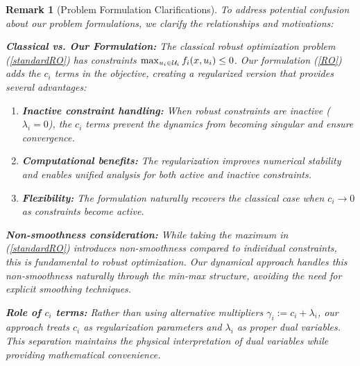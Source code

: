\documentclass[journal,twoside,web]{ieeecolor}
\newtheorem{remark}{Remark}
\begin{document}
{\color{blue} \begin{remark}[Problem Formulation Clarifications]
To address potential confusion about our problem formulations, we clarify the relationships and motivations:

\textbf{Classical vs. Our Formulation:} The classical robust optimization problem (\ref{standardRO}) has constraints $\max_{u_i \in {\cal U}_i} f_i(x,u_i) \leq 0$. Our formulation (\ref{RO}) adds the $c_i$ terms in the objective, creating a regularized version that provides several advantages:

\begin{enumerate}
\item \textbf{Inactive constraint handling:} When robust constraints are inactive ($\lambda_i = 0$), the $c_i$ terms prevent the dynamics from becoming singular and ensure convergence.
\item \textbf{Computational benefits:} The regularization improves numerical stability and enables unified analysis for both active and inactive constraints.
\item \textbf{Flexibility:} The formulation naturally recovers the classical case when $c_i \to 0$ as constraints become active.
\end{enumerate}

\textbf{Non-smoothness consideration:} While taking the maximum in (\ref{standardRO}) introduces non-smoothness compared to individual constraints, this is fundamental to robust optimization. Our dynamical approach handles this non-smoothness naturally through the min-max structure, avoiding the need for explicit smoothing techniques.

\textbf{Role of $c_i$ terms:} Rather than using alternative multipliers $\gamma_i := c_i + \lambda_i$, our approach treats $c_i$ as regularization parameters and $\lambda_i$ as proper dual variables. This separation maintains the physical interpretation of dual variables while providing mathematical convenience.


\end{remark}}
\end{document}

